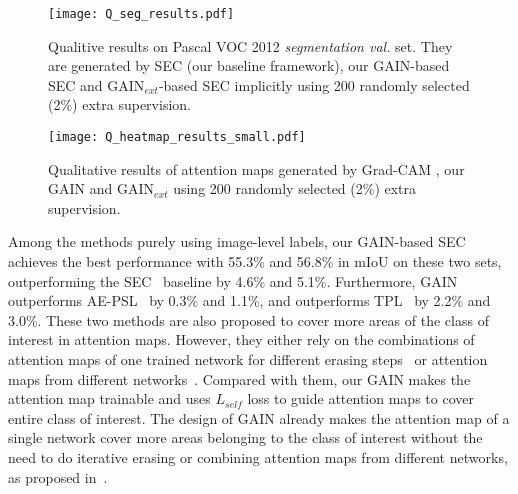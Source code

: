 \documentclass[10pt,twocolumn,letterpaper]{article}
\begin{document}
\begin{figure}%
\centering
\texttt{[image: Q\_seg\_results.pdf]} %
\caption{Qualitive results on Pascal VOC 2012 \emph{segmentation val.} set. They are generated by SEC (our baseline framework), our GAIN-based SEC and GAIN$_{ext}$-based SEC implicitly using 200 randomly selected (2\%) extra supervision.}
\label{fig:Q_seg} 
\end{figure} 



\begin{figure*}%
\centering
\texttt{[image: Q\_heatmap\_results\_small.pdf]} %
\caption{Qualitative results of attention maps generated by Grad-CAM \cite{grad-cam}, our GAIN and GAIN$_{ext}$ using 200 randomly selected (2\%) extra supervision.}
\label{fig:Q_heatmaps} 
\end{figure*} 
Among the methods purely using image-level labels, our GAIN-based SEC achieves the best performance with 55.3\% and 56.8\% in mIoU on these two sets, outperforming the SEC~\cite{kolesnikov2016seed} baseline by 4.6\% and 5.1\%. Furthermore, GAIN outperforms AE-PSL~\cite{wei2017object} by 0.3\% and 1.1\%, and outperforms TPL~\cite{kim2017two} by 2.2\% and 3.0\%. These two methods are also proposed to cover more areas of the class of interest in attention maps. However, they either rely on the combinations of attention maps of one trained network for different erasing steps~\cite{wei2017object} or attention maps from different networks~\cite{kim2017two}. Compared with them, our GAIN makes the attention map trainable and uses $L_{self}$ loss to guide attention maps to cover entire class of interest. The design of GAIN already makes the attention map of a single network cover more areas belonging to the class of interest without the need to do iterative erasing or combining attention maps from different networks, as proposed in~\cite{kim2017two,wei2017object}.



\end{document}

